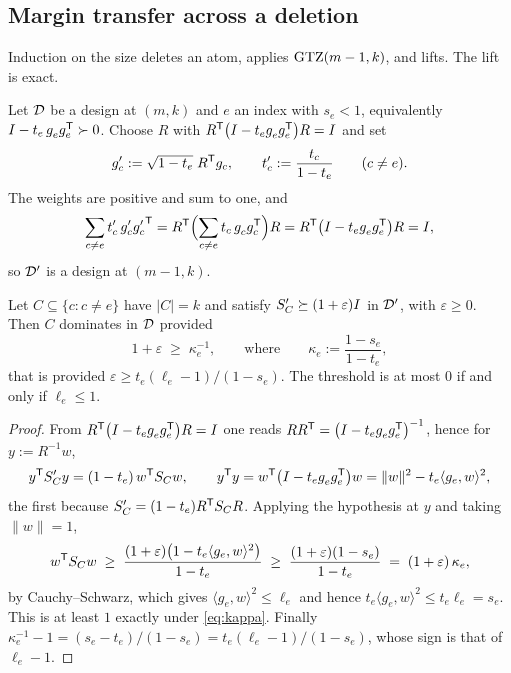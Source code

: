 \subsection{Margin transfer across a deletion}\label{app:transfer}

Induction on the size deletes an atom, applies $\mathrm{GTZ}(m-1,k)$, and lifts.
The lift is exact.

Let $\mathcal{D}$ be a design at $(m,k)$ and $e$ an index with $s_e<1$, equivalently
$I-t_e\,g_e^{\vphantom{\mathsf{T}}}g_e\tp\pd0$.  Choose $R$ with
$R\tp\bigl(I-t_e g_e^{\vphantom{\mathsf{T}}}g_e\tp\bigr)R=I$ and set
\[
  g'_c:=\sqrt{1-t_e}\;R^{\mathsf{T}} g_c,
  \qquad
  t'_c:=\frac{t_c}{1-t_e}
  \qquad (c\ne e).
\]
The weights are positive and sum to one, and
\[
  \sum_{c\ne e}t'_c\,g'^{\vphantom{\mathsf{T}}}_c{g'_c}\tp
  =R\tp\Bigl(\sum_{c\ne e}t_c\,g_c^{\vphantom{\mathsf{T}}}g_c\tp\Bigr)R
  =R\tp\bigl(I-t_e g_e^{\vphantom{\mathsf{T}}}g_e\tp\bigr)R=I,
\]
so $\mathcal{D}'$ is a design at $(m-1,k)$.

\begin{proposition}\label{prop:deletionprice}
Let $C\subseteq\{c:c\ne e\}$ have $\lvert C\rvert=k$ and satisfy
$S'_C\succeq(1+\varepsilon)I$ in $\mathcal{D}'$, with $\varepsilon\ge0$.  Then $C$
dominates in $\mathcal{D}$ provided
\begin{equation}\label{eq:kappa}
  1+\varepsilon\;\ge\;\kappa_e^{-1},
  \qquad\text{where}\qquad
  \kappa_e:=\frac{1-s_e}{1-t_e} ,
\end{equation}
that is provided $\varepsilon\ge t_e(\ell_e-1)/(1-s_e)$.  The threshold is at
most $0$ if and only if $\ell_e\le1$.
\end{proposition}

\begin{proof}
From $R\tp\bigl(I-t_eg_e^{\vphantom{\mathsf{T}}}g_e\tp\bigr)R=I$ one reads
$RR\tp=\bigl(I-t_eg_e^{\vphantom{\mathsf{T}}}g_e\tp\bigr)^{-1}$, hence for
$y:=R^{-1}w$,
\[
  y\tp S'_Cy=(1-t_e)\,w\tp S_Cw,
  \qquad
  y\tp y=w\tp\bigl(I-t_eg_e^{\vphantom{\mathsf{T}}}g_e\tp\bigr)w
        =\lVert w\rVert^2-t_e\langle g_e,w\rangle^2 ,
\]
the first because $S'_C=(1-t_e)R^{\mathsf{T}} S_CR$.  Applying the hypothesis at $y$ and
taking $\lVert w\rVert=1$,
\[
  w^{\mathsf{T}} S_Cw\;\ge\;\frac{(1+\varepsilon)\bigl(1-t_e\langle g_e,w\rangle^2\bigr)}
                       {1-t_e}
   \;\ge\;\frac{(1+\varepsilon)(1-s_e)}{1-t_e}
   \;=\;(1+\varepsilon)\,\kappa_e ,
\]
by Cauchy--Schwarz, which gives $\langle g_e,w\rangle^2\le\ell_e$ and hence
$t_e\langle g_e,w\rangle^2\le t_e\ell_e=s_e$.  This is at least $1$
exactly under \eqref{eq:kappa}.  Finally
$\kappa_e^{-1}-1=(s_e-t_e)/(1-s_e)=t_e(\ell_e-1)/(1-s_e)$, whose sign is that
of $\ell_e-1$.
\end{proof}

